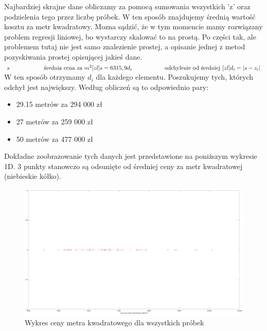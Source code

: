 Najbardziej skrajne dane obliczamy za pomocą sumowania wszystkich 'z' oraz podzielenia tego przez liczbę próbek. W ten sposób znajdujemy średnią wartość kosztu za metr kwadratowy. Mozna sądzić, że w tym momencie mamy rozwiązany problem regresji liniowej, bo wystarczy skalować to na prostą. Po części tak, ale problemem tutaj nie jest samo znalezienie prostej, a opisanie jednej z metod pozyskiwania prostej opisującej jakieś dane.
\newline
\newline
\noindent
\(
	s  \hspace{2.1cm} \textrm{średnia cena za } m^{2} [zl] \\
	s = 6315,9 \\
	d_{i}  \hspace{2cm} \textrm{odchylenie od średniej } [zl] \\
	d_{i} = |s - z_{i}| \\
\)
\newline
W ten sposób otrzymamy \(d_{i}\) dla każdego elementu. Poszukujemy tych, których odchył jest największy. Według obliczeń są to odpowiednio pary:
\begin{itemize}

  \item 29.15 metrów za 294 000 zł
  \item 27 metrów za 259 000 zł
  \item 50 metrów za 477 000 zł

\end{itemize}
\newpage
Dokładne zoobrazowanie tych danych jest przedstawione na poniższym wykresie 1D. 3 punkty stanowczo są odsunięte od średniej ceny za metr kwadratowej (niebieskie kółko).


	\begin{figure}[H]
    \centering
    \includegraphics[scale=0.20]{PNG/1D.png}
    \caption{Wykres ceny metra kwadratowego dla wszystkich próbek}
    \label{lamana}
	\end{figure}
	

